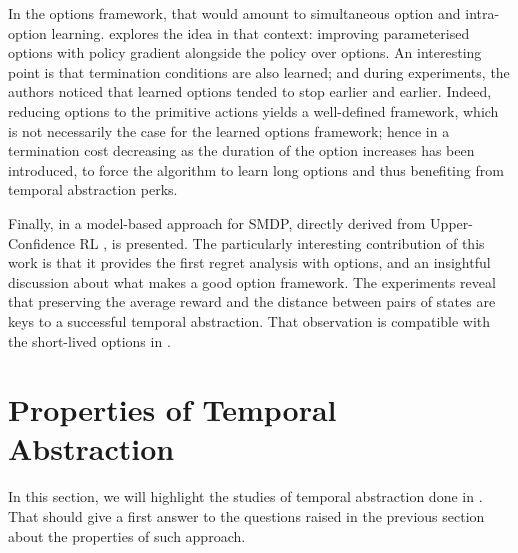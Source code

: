 In the options framework, that would amount to simultaneous option and intra-option learning. \citep{bacon_option-critic_2016} explores the idea in that context: improving parameterised options with policy gradient alongside the policy over options. An interesting point is that termination conditions are also learned; and during experiments, the authors noticed that learned options tended to stop earlier and earlier. Indeed, reducing options to the primitive actions yields a well-defined framework, which is not necessarily the case for the learned options framework; hence in \citep{harb_when_2017} a termination cost decreasing as the duration of the option increases has been introduced, to force the algorithm to learn long options and thus benefiting from temporal abstraction perks.

Finally, in \citep{fruit_exploration--exploitation_2017} a model-based approach for SMDP, directly derived from Upper-Confidence RL \citep{jaksch_near-optimal_2010}, is presented. The particularly interesting contribution of this work is that it provides the first regret analysis with options, and an insightful discussion about what makes a good option framework. The experiments reveal that preserving the average reward and the distance between pairs of states are keys to a successful temporal abstraction. That observation is compatible with the short-lived options in \citep{bacon_option-critic_2016}.

\section{Properties of Temporal Abstraction}

In this section, we will highlight the studies of temporal abstraction done in \citep{jong_utility_2008,nachum_why_2019}. That should give a first answer to the questions raised in the previous section about the properties of such approach.


